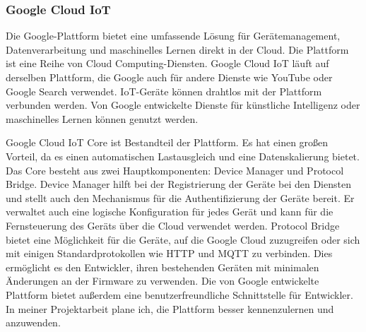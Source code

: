 \documentclass[12pt, a4paper]{article}
\begin{document}
\subsubsection{Google Cloud IoT}
\par Die Google-Plattform bietet eine umfassende Lösung für Gerätemanagement, Datenverarbeitung und maschinelles Lernen direkt in der Cloud. Die Plattform ist eine Reihe von Cloud Computing-Diensten. Google Cloud IoT läuft auf derselben Plattform, die Google auch für andere Dienste wie YouTube oder Google Search verwendet. IoT-Geräte können drahtlos mit der Plattform verbunden werden. Von Google entwickelte Dienste für künstliche Intelligenz oder maschinelles Lernen können genutzt werden. 
\par Google Cloud IoT Core ist Bestandteil der Plattform. Es hat einen großen Vorteil, da es einen automatischen Lastausgleich und eine Datenskalierung bietet. Das Core besteht aus zwei Hauptkomponenten: Device Manager und Protocol Bridge. Device Manager hilft bei der Registrierung der Geräte bei den Diensten und stellt auch den Mechanismus für die Authentifizierung der Geräte bereit. Er verwaltet auch eine logische Konfiguration für jedes Gerät und kann für die Fernsteuerung des Geräts über die Cloud verwendet werden. Protocol Bridge bietet eine Möglichkeit für die Geräte, auf die Google Cloud zuzugreifen oder sich mit einigen Standardprotokollen wie HTTP und MQTT zu verbinden. Dies ermöglicht es den Entwickler, ihren bestehenden Geräten mit minimalen Änderungen an der Firmware zu verwenden. Die von Google entwickelte Plattform bietet außerdem eine benutzerfreundliche Schnittstelle für Entwickler. In meiner Projektarbeit plane ich, die Plattform besser kennenzulernen und anzuwenden.
\end{document}
